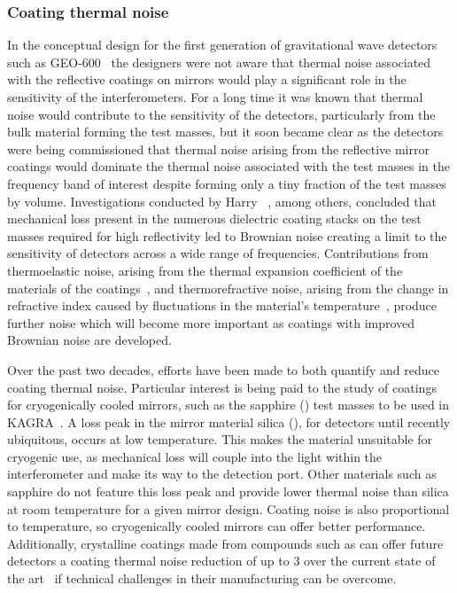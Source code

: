 \subsubsection{\label{sec:coating-thermal-noise}Coating thermal noise}
In the conceptual design for the first generation of gravitational wave detectors such as GEO-600~\cite{Willke2002} the designers were not aware that thermal noise associated with the reflective coatings on mirrors would play a significant role in the sensitivity of the interferometers. For a long time it was known that thermal noise would contribute to the sensitivity of the detectors, particularly from the bulk material forming the test masses, but it soon became clear as the detectors were being commissioned that thermal noise arising from the reflective mirror coatings would dominate the thermal noise associated with the test masses in the frequency band of interest despite forming only a tiny fraction of the test masses by volume. Investigations conducted by Harry \etal{}~\cite{Harry2002, Harry2007}, among others, concluded that mechanical loss present in the numerous dielectric coating stacks on the test masses required for high reflectivity led to Brownian noise creating a limit to the sensitivity of detectors across a wide range of frequencies. Contributions from thermoelastic noise, arising from the thermal expansion coefficient of the materials of the coatings~\cite{Braginsky1999a}, and thermorefractive noise, arising from the change in refractive index caused by fluctuations in the material's temperature~\cite{Braginsky2000a}, produce further noise which will become more important as coatings with improved Brownian noise are developed.

Over the past two decades, efforts have been made to both quantify and reduce coating thermal noise. Particular interest is being paid to the study of coatings for cryogenically cooled mirrors, such as the sapphire () test masses to be used in \gls{KAGRA}~\cite{Somiya2012}. A loss peak in the mirror material silica (), for detectors until recently ubiquitous, occurs at low temperature. This makes the material unsuitable for cryogenic use, as mechanical loss will couple into the light within the interferometer and make its way to the detection port. Other materials such as sapphire do not feature this loss peak and provide lower thermal noise than silica at room temperature for a given mirror design. Coating noise is also proportional to temperature, so cryogenically cooled mirrors can offer better performance. Additionally, crystalline coatings made from compounds such as  can offer future detectors a coating thermal noise reduction of up to \num{3} over the current state of the art~\cite{Cole2013} if technical challenges in their manufacturing can be overcome.

